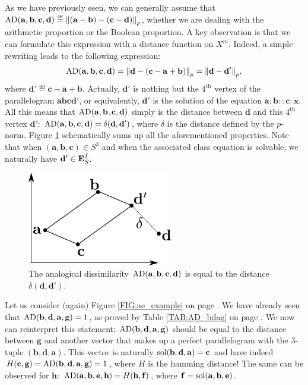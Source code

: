 As we have previously seen, we can generally assume that
$\AD(\mathbf{a},\mathbf{b},\mathbf{c},\mathbf{d}) \eqdef
\norm{p}{(\mathbf{a}-\mathbf{b})-(\mathbf{c}-\mathbf{d})}$, whether we are
dealing with the arithmetic proportion or the Boolean proportion.
A key observation is that we can formulate this expression with a distance
function on $X^m$. Indeed, a simple rewriting leads to the following expression:
$$\AD(\mathbf{a},\mathbf{b},\mathbf{c},\mathbf{d})=\norm{p}{\mathbf{d} -
(\mathbf{c}-\mathbf{a}+\mathbf{b})}=\norm{p}{\mathbf{d} - \mathbf{d}'},$$
where $\mathbf{d}'\eqdef\mathbf{c}-\mathbf{a}+\mathbf{b}$. Actually,
$\mathbf{d}'$ is nothing but the $4^\text{th}$ vertex of the parallelogram
$\mathbf{a}\mathbf{b}\mathbf{c}\mathbf{d}'$, or equivalently, $\mathbf{d}'$ is
the
solution of the equation $\mathbf{a}: \mathbf{b} :: \mathbf{c} : \mathbf{x}$.
All this means that $\AD(\mathbf{a},\mathbf{b},\mathbf{c},\mathbf{d})$ simply
is the distance between $\mathbf{d}$ and this $4^\text{th}$ vertex
$\mathbf{d}'$: $\AD(\mathbf{a},\mathbf{b},\mathbf{c},\mathbf{d}) =
\delta(\mathbf{d}, \mathbf{d}')$, where $\delta$ is the distance defined by
the $p$-norm. Figure \ref{FIG:analogical_dissimilarity} schematically sums up all the aforementioned
properties.  Note that when $(\mathbf{a}, \mathbf{b}, \mathbf{c}) \in S^3$ and
when the associated class equation is solvable, we naturally have $\mathbf{d}'
\in \esf$.
\begin{figure}[!h]
\centering
  \includegraphics[width=2.5in]{figures/analogical_dissimilarity.pdf}
  \caption{The analogical dissimilarity
  $\AD(\mathbf{a},\mathbf{b},\mathbf{c},\mathbf{d})$ is equal to the distance
  $\delta(\mathbf{d}, \mathbf{d}')$.}
\label{FIG:analogical_dissimilarity}
\end{figure}

\begin{testexample}
Let us consider (again) Figure \ref{FIG:ae_example} on page
\pageref{FIG:ae_example2}. We have already seen that $\AD(\mathbf{b},
\mathbf{d}, \mathbf{a}, \mathbf{g}) = 1$, as proved by Table \ref{TAB:AD_bdag}
  on page \pageref{TAB:AD_bdag}.
We now can reinterpret this statement: $\AD(\mathbf{b}, \mathbf{d}, \mathbf{a},
\mathbf{g})$ should be equal to the distance between $\mathbf{g}$ and another
vector that makes up a perfect parallelogram with the $3$-tuple
$(\mathbf{b},\mathbf{d}, \mathbf{a})$. This vector is naturally
$\sol(\mathbf{b},\mathbf{d}, \mathbf{a}) = \mathbf{c}$ and have indeed
$H(\mathbf{c}, \mathbf{g}) =  \AD(\mathbf{b}, \mathbf{d}, \mathbf{a},
\mathbf{g}) = 1$, where $H$ is the hamming distance! The same can be observed
for $\mathbf{h}$: $\AD(\mathbf{a}, \mathbf{b}, \mathbf{e}, \mathbf{h}) =
H(\mathbf{h}, \mathbf{f})$, where $\mathbf{f} = \sol(\mathbf{a}, \mathbf{b},
\mathbf{e})$.
\end{testexample}

